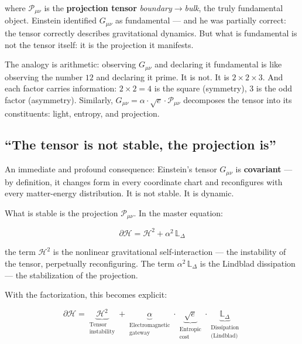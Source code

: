 \documentclass[12pt,a4paper,twoside]{article}
\newcommand{\alphaii}{\alpha^{2}}
\newcommand{\boundary}{\textit{boundary}}
\newcommand{\bulk}{\textit{bulk}}
\begin{document}
\noindent where $\mathcal{P}_{\mu\nu}$ is the \textbf{projection tensor} \boundary$\to$\bulk, the truly fundamental object. Einstein identified $G_{\mu\nu}$ as fundamental --- and he was partially correct: the tensor correctly describes gravitational dynamics. But what is fundamental is not the tensor itself: it is the projection it manifests.

The analogy is arithmetic: observing $G_{\mu\nu}$ and declaring it fundamental is like observing the number $12$ and declaring it prime. It is not. It is $2 \times 2 \times 3$. And each factor carries information: $2 \times 2 = 4$ is the square (symmetry), $3$ is the odd factor (asymmetry). Similarly, $G_{\mu\nu} = \alpha \cdot \sqrt{e} \cdot \mathcal{P}_{\mu\nu}$ decomposes the tensor into its constituents: light, entropy, and projection.

\subsection{``The tensor is not stable, the projection is''}

An immediate and profound consequence: Einstein's tensor $G_{\mu\nu}$ is \textbf{covariant} --- by definition, it changes form in every coordinate chart and reconfigures with every matter-energy distribution. It is not stable. It is dynamic.

What is stable is the projection $\mathcal{P}_{\mu\nu}$. In the master equation:

\begin{equation}
\partial\mathcal{H} = \mathcal{H}^2 + \alphaii\,\mathbb{L}_\Delta
\end{equation}

\noindent the term $\mathcal{H}^2$ is the nonlinear gravitational self-interaction --- the instability of the tensor, perpetually reconfiguring. The term $\alphaii\,\mathbb{L}_\Delta$ is the Lindblad dissipation --- the stabilization of the projection.

With the factorization, this becomes explicit:

\begin{equation}
\partial\mathcal{H} = \underbrace{\mathcal{H}^2}_{\substack{\text{Tensor}\\\text{instability}}} + \underbrace{\alpha}_{\substack{\text{Electromagnetic}\\\text{gateway}}} \cdot \underbrace{\sqrt{e}}_{\substack{\text{Entropic}\\\text{cost}}} \cdot \underbrace{\mathbb{L}_\Delta}_{\substack{\text{Dissipation}\\\text{(Lindblad)}}}
\label{eq:mestra_decomposta}
\end{equation}
\end{document}
